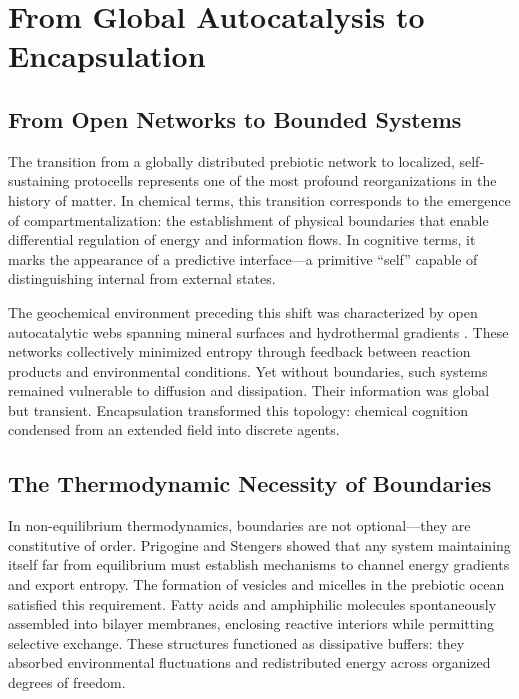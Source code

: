 \documentclass[11pt,a4paper]{article}
\begin{document}

\section{From Global Autocatalysis to Encapsulation}
\label{sec:encapsulation}

\subsection{From Open Networks to Bounded Systems}

The transition from a globally distributed prebiotic network to localized, self-sustaining protocells represents one of the most profound reorganizations in the history of matter.  In chemical terms, this transition corresponds to the emergence of compartmentalization: the establishment of physical boundaries that enable differential regulation of energy and information flows.  In cognitive terms, it marks the appearance of a predictive interface—a primitive ``self'' capable of distinguishing internal from external states.  

The geochemical environment preceding this shift was characterized by open autocatalytic webs spanning mineral surfaces and hydrothermal gradients \citep{Hazen2008MineralEvolution, Kauffman1993OriginsOfOrder}.  These networks collectively minimized entropy through feedback between reaction products and environmental conditions.  Yet without boundaries, such systems remained vulnerable to diffusion and dissipation.  Their information was global but transient.  Encapsulation transformed this topology: chemical cognition condensed from an extended field into discrete agents.  

\subsection{The Thermodynamic Necessity of Boundaries}

In non-equilibrium thermodynamics, boundaries are not optional—they are constitutive of order.  Prigogine and Stengers \citep{Prigogine1977SelfOrganizationNonequilibrium} showed that any system maintaining itself far from equilibrium must establish mechanisms to channel energy gradients and export entropy.  The formation of vesicles and micelles in the prebiotic ocean satisfied this requirement.  Fatty acids and amphiphilic molecules spontaneously assembled into bilayer membranes, enclosing reactive interiors while permitting selective exchange.  These structures functioned as dissipative buffers: they absorbed environmental fluctuations and redistributed energy across organized degrees of freedom.  
\end{document}
